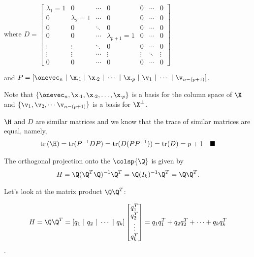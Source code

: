 \documentclass[12pt]{article}
\begin{document}
\begin{enumerate}
\begin{tcolorbox}[colback = white, sharp corners]
where $D = \begin{bmatrix}
\lambda_1 = 1 & 0 & \cdots & 0 & 0 & \cdots & 0  \\
0 & \lambda_2 = 1 & \cdots & 0 & 0 & \cdots & 0 \\
0 & 0 & \ddots & 0 & 0 & \cdots & 0 \\
0 & 0  & \cdots & \lambda_{p+1} = 1 & 0 & \cdots & 0 \\
\vdots & \vdots & \ddots & 0 & 0 & \cdots & 0 \\
\vdots & \vdots & \cdots & \vdots & \vdots & \ddots & \vdots  \\
0 & 0 & \cdots & 0 & 0 & \cdots &  0
\end{bmatrix}$

\vspace{2mm}

and $P = [\onevec_n ~|~ \x_{\cdot 1} ~|~ \x_{\cdot 2} ~|~ \cdots ~|~ \x_{\cdot p} ~|~ \v_{1} ~|~ \cdots ~|~ \v_{n-(p+1)}  ] $. 

\vspace{2mm}

Note that $\lbrace \onevec_n, \x_{\cdot 1}, \x_{\cdot 2}, \ldots, \x_{\cdot p} \rbrace$ is a basis for the column space of $\X$ and $\lbrace \v_{1}, \v_{2}, \cdots \v_{n - (p+1)} \rbrace$ is a basis for $\X^{\perp}$.

\vspace{2mm}


$\H$ and $D$ are similar matrices and we know that the trace of similar matrices are equal, namely,
\[
\text{tr}\left( \H \right) = \text{tr}(P^{-1} D P) = \text{tr}(D(PP^{-1})) = \text{tr}(D) = p+1 \quad \blacksquare
\]
\end{tcolorbox}

\newpage

\begin{tcolorbox}[colback = white, sharp corners]

The orthogonal projection onto the $\colsp{\Q}$ is given by 
\[
	H = \Q(\Q^T\Q)^{-1}\Q^T = \Q(I_k)^{-1}\Q^T = \Q \Q^T. 
\]

Let's look at the matrix product $\Q \Q^T$:

\[
	H = \Q \Q^T = [q_1~|~q_2~|~\cdots~|~q_k] \begin{bmatrix}
	q_1^T \\
	q_2^T \\
	\vdots \\
	q_k^T
	\end{bmatrix} = q_1 q_1^T + q_2 q_2^T + \cdots + q_k q_k^T
\]. 


\end{tcolorbox}
\end{enumerate}
\end{document}
